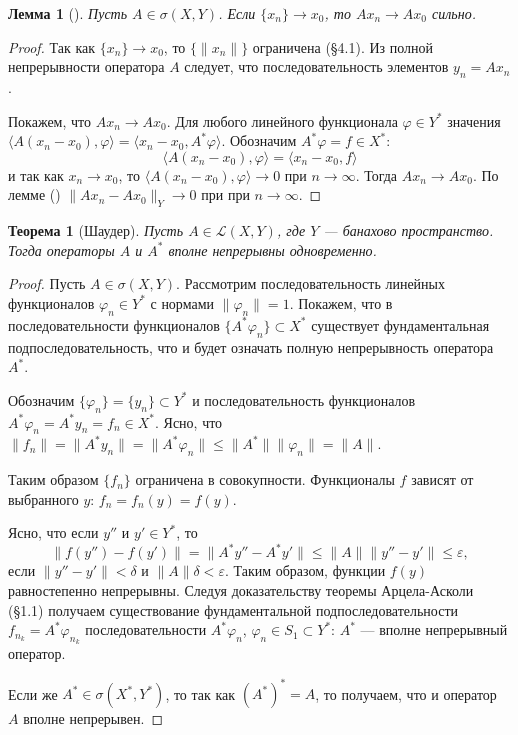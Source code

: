 \documentclass[12pt,a4paper,titlepage,oneside]{book}
\newcommand{\rom}[1]{\uppercase\expandafter{\romannumeral #1\relax}}
\theoremstyle{definition}
\theoremstyle{plain}
\newtheorem*{theorem}{Теорема}
\theoremstyle{break}
\theoremstyle{remark}
\theoremstyle{remark}
\theoremstyle{remark}
\theoremstyle{remark}
\theoremstyle{plain}
\newtheorem*{lemma}{Лемма}
\theoremstyle{plain}
\begin{document}
\begin{lemma}[\rom{2}]
Пусть $A \in \sigma(X,Y)$. Если $\{x_n\}\to x_0$, то $Ax_n\to Ax_0$ сильно.
\end{lemma}

\begin{proof}
Так как $\{x_n\}\to x_0$, то $\{\lVert x_n\rVert\}$ ограничена (\S 4.1). Из полной непрерывности оператора $A$ следует, что последовательность элементов $y_n = Ax_n$ .

Покажем, что $Ax_n\to Ax_0$.
Для любого линейного функционала $\varphi\in Y^*$ значения $ \langle A(x_n-x_0), \varphi \rangle  =  \langle x_n-x_0, A^*\varphi \rangle $. Обозначим $A^*\varphi = f\in X^*$:
\begin{equation*}
\langle A(x_n-x_0), \varphi \rangle  =  \langle x_n-x_0, f \rangle 
\end{equation*}
и так как $x_n\to x_0$, то $ \langle A(x_n-x_0), \varphi \rangle \to 0$ при $n\to\infty$. Тогда $Ax_n\to Ax_0$. По лемме (\rom{1}) $\lVert Ax_n-Ax_0\rVert_Y\to 0$ при при $n\to\infty$.
\end{proof}

\begin{theorem}[Шаудер]
Пусть $A \in \mathcal{L}(X, Y)$, где $Y$ --- банахово пространство. Тогда операторы $A$ и $A^*$ вполне непрерывны одновременно.
\end{theorem}

\begin{proof}
Пусть $A \in \sigma(X, Y)$. Рассмотрим последовательность линейных функционалов $\varphi_n \in Y^*$ с нормами $\lVert  \varphi_n \rVert = 1$. Покажем, что в последовательности функционалов $\{ A^* \varphi_n \} \subset X^*$ существует фундаментальная подпоследовательность, что и будет означать полную непрерывность оператора $A^*$.

Обозначим $\{\varphi_n\} = \{y_n\}\subset Y^*$ и последовательность функционалов $A^*\varphi_n = A^*y_n = f_n\in X^*$. Ясно, что $\lVert f_n\rVert = \lVert A^*y_n\rVert = \lVert A^*\varphi_n\rVert \leqslant \lVert A^*\rVert\lVert \varphi_n\rVert = \lVert A\rVert$.

Таким образом $\{f_n\}$ ограничена в совокупности. Функционалы $f$ зависят от выбранного $y$: $f_n = f_n(y) = f(y)$.

Ясно, что если $y''$ и $y'\in Y^*$, то
\begin{equation*}
\lVert f(y'')-f(y')\rVert = \lVert A^*y''-A^*y'\rVert\le\lVert A\rVert\lVert y''-y'\rVert\le\varepsilon,
\end{equation*}
если $\lVert y''-y'\rVert < \delta$ и $\lVert A\rVert\delta < \varepsilon$.
Таким образом, функции $f(y)$ равностепенно непрерывны. Следуя доказательству теоремы Арцела-Асколи (\S 1.1) получаем существование фундаментальной подпоследовательности $f_{n_k} = A^* \varphi_{n_k}$ последовательности $A^*\varphi_n$, $\varphi_n\in S_1\subset Y^*$: $A^*$ --- вполне непрерывный оператор.

Если же $A^*\in\sigma(X^*,Y^*)$, то так как $(A^*)^* = A$, то получаем, что и оператор $A$ вполне непрерывен.
\end{proof}
\end{document}
